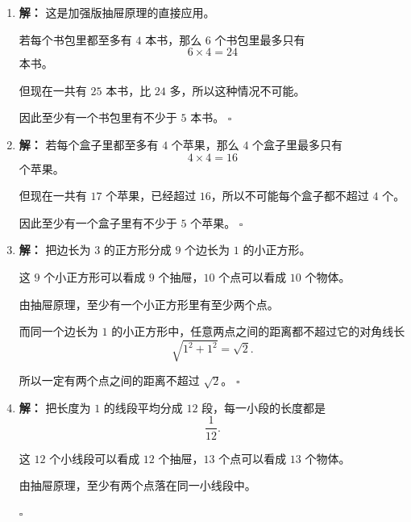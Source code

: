 \documentclass[11pt,a4paper,fontset=fandol]{ctexart}
\theoremstyle{formalexample}
\newenvironment{solution}{\par\noindent\textbf{解：}}{\hfill$\square$\par}
\begin{document}
\begin{enumerate}
\begin{solution}
  若想暂时避免出现差为 $6$ 的倍数的两个数，那么每一类最多只能取 $1$ 个数。

  所以最多可以安全地取
  \[
  6
  \]
  个数。

  再多取 $1$ 个，也就是取
  \[
  7
  \]
  个数时，就一定有两数落在同一余数类中，从而它们的差是 $6$ 的倍数。

  因此最少取 \textbf{7 个}。
  \end{solution}

  \item \begin{solution}
  这是加强版抽屉原理的直接应用。

  若每个书包里都至多有 $4$ 本书，那么 $6$ 个书包里最多只有
  \[
  6\times 4=24
  \]
  本书。

  但现在一共有 $25$ 本书，比 $24$ 多，所以这种情况不可能。

  因此至少有一个书包里有不少于 $5$ 本书。
  \end{solution}

  \item \begin{solution}
  若每个盒子里都至多有 $4$ 个苹果，那么 $4$ 个盒子里最多只有
  \[
  4\times 4=16
  \]
  个苹果。

  但现在一共有 $17$ 个苹果，已经超过 $16$，所以不可能每个盒子都不超过 $4$ 个。

  因此至少有一个盒子里有不少于 $5$ 个苹果。
  \end{solution}

  \item \begin{solution}
  把边长为 $3$ 的正方形分成 $9$ 个边长为 $1$ 的小正方形。

  这 $9$ 个小正方形可以看成 $9$ 个抽屉，$10$ 个点可以看成 $10$ 个物体。

  由抽屉原理，至少有一个小正方形里有至少两个点。

  而同一个边长为 $1$ 的小正方形中，任意两点之间的距离都不超过它的对角线长
  \[
  \sqrt{1^2+1^2}=\sqrt{2}.
  \]

  所以一定有两个点之间的距离不超过 $\sqrt{2}$。
  \end{solution}

  \item \begin{solution}
  把长度为 $1$ 的线段平均分成 $12$ 段，每一小段的长度都是
  \[
  \frac{1}{12}.
  \]

  这 $12$ 个小线段可以看成 $12$ 个抽屉，$13$ 个点可以看成 $13$ 个物体。

  由抽屉原理，至少有两个点落在同一小线段中。


\end{solution}
\end{enumerate}
\end{document}
